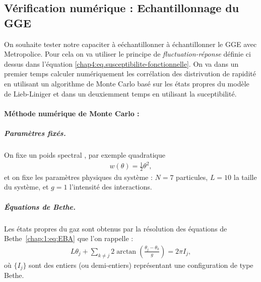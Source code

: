 \subsection{Vérification numérique : Echantillonnage du GGE}

On souhaite tester notre capaciter à eéchantillonner à échantillonner le GGE avec Metropolice. Pour cela on va utiliser le principe de \emph{fluctuation-réponse} définie ci dessus dans l'équation \eqref{chap4:eq.susceptibilite-fonctionnelle}. On va dans un premier temps calculer numériquement les corrélation des distrivution de rapidité en utilisant un algorithme de Monte Carlo basé sur les états propres du modèle de Lieb-Liniger et dans un deuxiemment temps en utilisant la suceptibilité.




\paragraph{Méthode numérique de Monte Carlo  :} 

\subparagraph{Paramètres fixés.}
On fixe un poids spectral , par exemple quadratique
\begin{eqnarray}
	w(\theta) = \tfrac{1}{2} \theta^2,
\end{eqnarray}
et on fixe les paramètres physiques du système : \( N = 7 \) particules, \( L = 10 \) la taille du système, et \( g = 1 \) l’intensité des interactions.

\subparagraph{Équations de Bethe.}
Les états propres du gaz sont obtenus par la résolution des équations de Bethe~\eqref{chap:1:eq:EBA} que l'on rappelle :
\begin{eqnarray}
	L \theta_j + \sum_{k \ne j} 2 \arctan \left( \frac{\theta_j - \theta_k}{g} \right) = 2 \pi I_j,
\end{eqnarray}
où \( \{I_j\} \) sont des entiers (ou demi-entiers) représentant une configuration de type Bethe.\\

